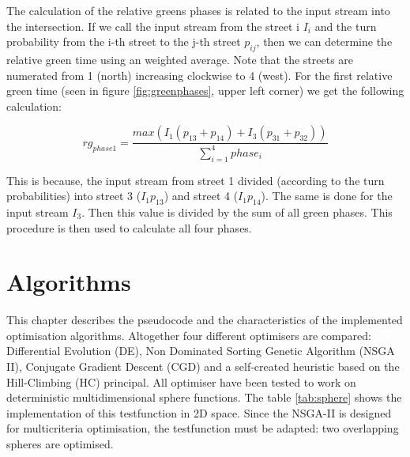 \documentclass[./\jobname.tex]{subfiles}
\begin{document}
The calculation of the relative greens phases is related to the input stream into the intersection. If we call the input stream from the street i $I_{i}$ and the turn probability from the i-th street to the j-th street $p_{ij}$, then we can determine the relative green time using an weighted average. Note that the streets are numerated from 1 (north) increasing clockwise to 4 (west). For the first relative green time (seen in figure \ref{fig:greenphases}, upper left corner) we get the following calculation:

\begin{equation}\label{key}
rg_{phase 1} = \frac{max(I_{1}(p_{13} + p_{14})+I_{3}(p_{31}+p_{32}))}{\sum_{i=1}^{4}phase_{i}} 
\end{equation}

This is because, the input stream from street 1 divided (according to the turn probabilities) into street 3 ($I_{1}p_{13}$) and street 4 ($I_{1}p_{14}$). The same is done for the input stream $I_{3}$. Then this value is divided by the sum of all green phases. This procedure is then used to calculate all four phases.



\chapter{Algorithms}
This chapter describes the pseudocode and the characteristics of the implemented optimisation algorithms. Altogether four different optimisers are compared: Differential Evolution (DE), Non Dominated Sorting Genetic Algorithm (NSGA II), Conjugate Gradient Descent (CGD) and a self-created heuristic based on the Hill-Climbing (HC) principal. All optimiser have been tested to work on deterministic multidimensional sphere functions. The table \ref{tab:sphere} shows the implementation of this testfunction in 2D space. Since the NSGA-II is designed for multicriteria optimisation, the testfunction must be adapted: two overlapping spheres are optimised. 
\end{document}

